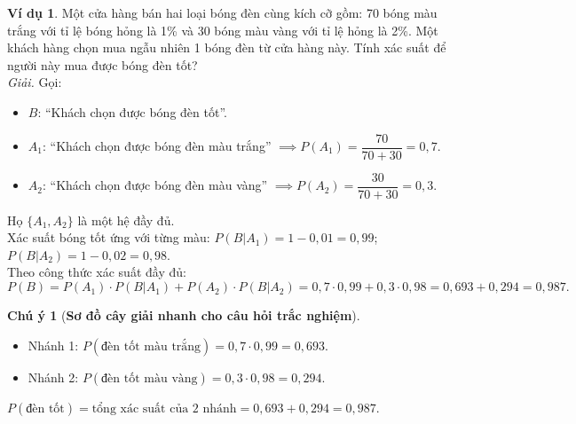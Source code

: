 \documentclass[12pt,a4paper]{article}
\theoremstyle{definition}
\newtheorem{vidu}{Ví dụ}[section]
\newtheorem{chuy}{Chú ý}[section]
\begin{document}
\begin{vidu}
Một cửa hàng bán hai loại bóng đèn cùng kích cỡ gồm: 70 bóng màu trắng với tỉ lệ bóng hỏng là 1\% và 30 bóng màu vàng với tỉ lệ hỏng là 2\%. Một khách hàng chọn mua ngẫu nhiên 1 bóng đèn từ cửa hàng này. Tính xác suất để người này mua được bóng đèn tốt?\\
\textit{Giải.} 
Gọi:
\begin{itemize}
    \item $B$: ``Khách chọn được bóng đèn tốt''.
    \item $A_1$: ``Khách chọn được bóng đèn màu trắng'' $\implies P(A_1) = \dfrac{70}{70 + 30} = 0{,}7$.
    \item $A_2$: ``Khách chọn được bóng đèn màu vàng'' $\implies P(A_2) = \dfrac{30}{70 + 30} = 0{,}3$.
\end{itemize}
Họ $\{A_1, A_2\}$ là một hệ đầy đủ.\\
Xác suất bóng tốt ứng với từng màu:
$P(B|A_1) = 1 - 0{,}01 = 0{,}99$;\quad $P(B|A_2) = 1 - 0{,}02 = 0{,}98$.\\
Theo công thức xác suất đầy đủ:
\[
P(B) = P(A_1) \cdot P(B|A_1) + P(A_2) \cdot P(B|A_2) = 0{,}7 \cdot 0{,}99 + 0{,}3 \cdot 0{,}98 = 0{,}693 + 0{,}294 = 0{,}987.
\]
\end{vidu}

\begin{chuy}[\textbf{Sơ đồ cây giải nhanh cho câu hỏi trắc nghiệm}]
\begin{itemize}
    \item Nhánh 1: $P(\text{đèn tốt màu trắng}) = 0{,}7 \cdot 0{,}99 = 0{,}693$.
    \item Nhánh 2: $P(\text{đèn tốt màu vàng}) = 0{,}3 \cdot 0{,}98 = 0{,}294$.
\end{itemize}
$P(\text{đèn tốt}) = \text{tổng xác suất của 2 nhánh} = 0{,}693 + 0{,}294 = 0{,}987$.
\end{chuy}
\end{document}
